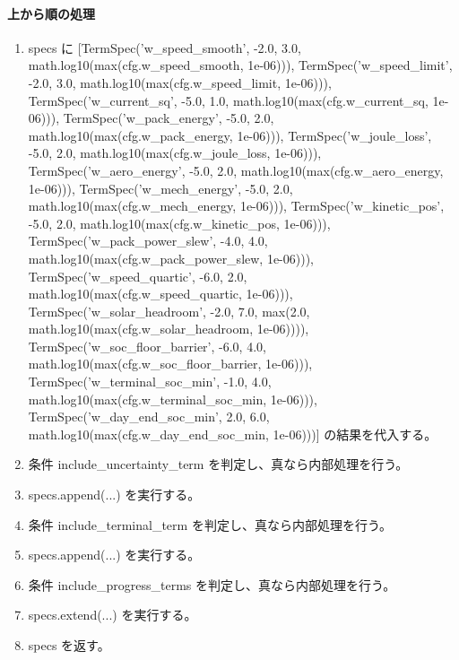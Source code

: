 \documentclass[a4paper,11pt]{article}
\begin{document}
            \paragraph{上から順の処理}
            \begin{enumerate}[leftmargin=1.8em]
            \item specs に [TermSpec('w\_speed\_smooth', -2.0, 3.0, math.log10(max(cfg.w\_speed\_smooth, 1e-06))), TermSpec('w\_speed\_limit', -2.0, 3.0, math.log10(max(cfg.w\_speed\_limit, 1e-06))), TermSpec('w\_current\_sq', -5.0, 1.0, math.log10(max(cfg.w\_current\_sq, 1e-06))), TermSpec('w\_pack\_energy', -5.0, 2.0, math.log10(max(cfg.w\_pack\_energy, 1e-06))), TermSpec('w\_joule\_loss', -5.0, 2.0, math.log10(max(cfg.w\_joule\_loss, 1e-06))), TermSpec('w\_aero\_energy', -5.0, 2.0, math.log10(max(cfg.w\_aero\_energy, 1e-06))), TermSpec('w\_mech\_energy', -5.0, 2.0, math.log10(max(cfg.w\_mech\_energy, 1e-06))), TermSpec('w\_kinetic\_pos', -5.0, 2.0, math.log10(max(cfg.w\_kinetic\_pos, 1e-06))), TermSpec('w\_pack\_power\_slew', -4.0, 4.0, math.log10(max(cfg.w\_pack\_power\_slew, 1e-06))), TermSpec('w\_speed\_quartic', -6.0, 2.0, math.log10(max(cfg.w\_speed\_quartic, 1e-06))), TermSpec('w\_solar\_headroom', -2.0, 7.0, max(2.0, math.log10(max(cfg.w\_solar\_headroom, 1e-06)))), TermSpec('w\_soc\_floor\_barrier', -6.0, 4.0, math.log10(max(cfg.w\_soc\_floor\_barrier, 1e-06))), TermSpec('w\_terminal\_soc\_min', -1.0, 4.0, math.log10(max(cfg.w\_terminal\_soc\_min, 1e-06))), TermSpec('w\_day\_end\_soc\_min', 2.0, 6.0, math.log10(max(cfg.w\_day\_end\_soc\_min, 1e-06)))] の結果を代入する。
\item 条件 include\_uncertainty\_term を判定し、真なら内部処理を行う。
\item   specs.append(...) を実行する。
\item 条件 include\_terminal\_term を判定し、真なら内部処理を行う。
\item   specs.append(...) を実行する。
\item 条件 include\_progress\_terms を判定し、真なら内部処理を行う。
\item   specs.extend(...) を実行する。
\item specs を返す。
            \end{enumerate}
\end{document}
